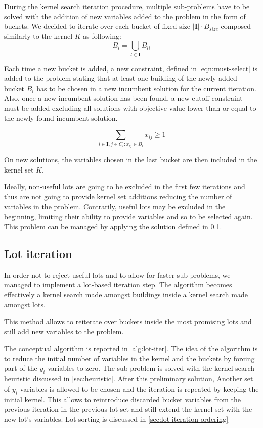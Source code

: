 \documentclass[a4paper, twocolumn, oneside, 10pt]{article}
\begin{document}
During the kernel search iteration procedure, multiple sub-problems have to be solved with the addition of new variables added to the problem in the form of buckets. We decided to iterate over each bucket of fixed size \(|\mathbf{I}| \cdot B_{size}\) composed similarly to the kernel \(K\) as following: \[B_i = \bigcup_{l \in \mathbf{I}} B_{li}\]

Each time a new bucket is added, a new constraint, defined in \cref{eqn:must-select} is added to the problem stating that at least one building of the newly added bucket \(B_i\) has to be chosen in a new incumbent solution for the current iteration. Also, once a new incumbent solution has been found, a new cutoff constraint must be added excluding all solutions with objective value lower than or equal to the newly found incumbent solution.

\begin{equation}\label{eqn:must-select}
	\sum_{i \in \mathbf{I}, j \in C_i : x_{ij} \in B_i} x_{ij} \geq 1 
\end{equation}

On new solutions, the variables chosen in the last bucket are then included in the kernel set \(K\).

Ideally, non-useful lots are going to be excluded in the first few iterations and thus are not going to provide kernel set additions reducing the number of variables in the problem. Contrarily, useful lots may be excluded in the beginning, limiting their ability to provide variables and so to be selected again. This problem can be managed by applying the solution defined in \cref{sec:lot-iteration}.

\subsection{Lot iteration}\label{sec:lot-iteration}
In order not to reject useful lots and to allow for faster sub-problems, we managed to implement a lot-based iteration step. The algorithm becomes effectively a kernel search made amongst buildings inside a kernel search made amongst lots.

This method allows to reiterate over buckets inside the most promising lots and still add new variables to the problem.

The conceptual algorithm is reported in \cref{alg:lot-iter}. The idea of the algorithm is to reduce the initial number of variables in the kernel and the buckets by forcing part of the \(y_i\) variables to zero. The sub-problem is solved with the kernel search heuristic discussed in \cref{sec:heuristic}. After this preliminary solution, Another set of \(y_i\) variables is allowed to be chosen and the iteration is repeated by keeping the initial kernel. This allows to reintroduce discarded bucket variables from the previous iteration in the previous lot set and still extend the kernel set with the new lot's variables. Lot sorting is discussed in \cref{sec:lot-iteration-ordering}
\end{document}
